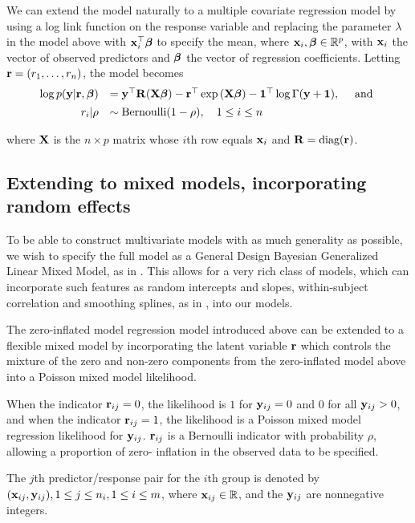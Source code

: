 We can extend the model naturally to a multiple covariate regression model by using a log link function on the
response variable and replacing the parameter $\lambda$ in the model above with ${\bf x}_i^\top {\boldsymbol\beta}$ to specify
the mean, where ${\bf x}_i,{\boldsymbol \beta} \in {\mathbb{R}}^p$, with ${\bf x}_i$ the vector of observed predictors and ${\boldsymbol \beta}$ the
vector of regression coefficients. Letting ${\bf r} = (r_1,\ldots,r_n)$, the model becomes
\[%
	\begin{array}{rl}
		\log p(\vy|\vr, \vbeta) 
		    & = \vy^\top \mR (\mX\vbeta)                           
		- \vr^\top \exp{(\mX\vbeta)} 
		- \vone^\top \log{\Gamma{(\vy + \vone)}}, \quad \mbox{ and }\\ [1ex]
		r_i | \rho & \sim \text{Bernoulli}(1-\rho), \quad 1 \leq i \leq n \\
	\end{array}
\]

\noindent where ${\bf X}$ is the $n\times p$ matrix whose $i$th row equals ${\bf x}_i$ and ${\bf R} = \text{diag}{({\bf r})}$.

\subsection{Extending to mixed models, incorporating random effects}

To be able to construct multivariate models with as much generality as possible, we wish to specify the full
model as a General Design Bayesian Generalized Linear Mixed Model, as in \citep{Zhao2006}. This allows for a
very rich class of models, which can incorporate such features as random intercepts and slopes, within-subject
correlation and smoothing splines, as in \citep{Wand2008}, into our models.

The zero-inflated model regression model introduced above can be extended to a flexible mixed model by
incorporating the latent variable ${\bf r}$ which controls the mixture of the zero and non-zero components from
the zero-inflated model above into a Poisson mixed model likelihood.

When the indicator ${\bf r}_{ij} = 0$, the likelihood is $1$ for ${\bf y}_{ij} = 0$ and $0$ for all ${\bf y}_{ij} > 0$,
and when the indicator ${\bf r}_{ij} = 1$, the likelihood is a Poisson mixed model regression likelihood for
${\bf y}_{ij}$. ${\bf r}_{ij}$ is a Bernoulli indicator with probability $\rho$, allowing a proportion of zero-
inflation in the observed data to be specified.

The $j$th predictor/response pair for the $i$th group is denoted by $({\bf x}_{ij}, {\bf y}_{ij}), 1 \leq j \leq n_i, 1 \leq i \leq m$, where ${\bf x}_{ij} \in {\mathbb{R}}$, and the ${\bf y}_{ij}$ are nonnegative integers.

